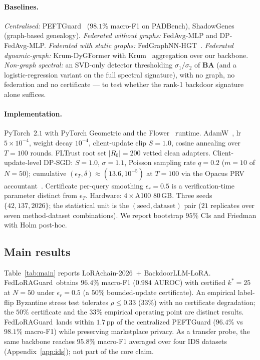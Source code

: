 \documentclass[11pt]{article}
\theoremstyle{plain}
\theoremstyle{definition}
\theoremstyle{remark}
\newcommand{\modelname}{FedLoRAGuard}
\newcommand{\benchname}{LoRAchain-2026}
\begin{document}
\paragraph{Baselines.}
\emph{Centralised:} PEFTGuard~\cite{sun2025peftguard} ($98.1\%$
macro-F1 on PADBench), ShadowGenes~\cite{schulz2025shadowgenes}
(graph-based genealogy).
\emph{Federated without graphs:} FedAvg-MLP and DP-FedAvg-MLP.
\emph{Federated with static graphs:}
FedGraphNN-HGT~\cite{he2021fedgraphnn}.
\emph{Federated dynamic-graph:} Krum-DyGFormer with
Krum~\cite{blanchard2017machine} aggregation over our backbone.
\emph{Non-graph spectral:} an SVD-only detector thresholding
$\sigma_1/\sigma_2$ of $\mathbf{B}\mathbf{A}$ (and a
logistic-regression variant on the full spectral signature), with
no graph, no federation and no certificate --- to test whether the
rank-1 backdoor signature alone suffices.

\paragraph{Implementation.}
PyTorch~$2.1$ with PyTorch Geometric and the
Flower~\cite{beutel2020flower} runtime. AdamW~\cite{loshchilov2019adamw},
lr $5\!\times\!10^{-4}$, weight decay $10^{-4}$, client-update
clip $S\!=\!1.0$, cosine annealing over $T\!=\!100$ rounds.
FLTrust root set $|R_0|\!=\!200$ vetted clean adapters.
Client-update-level DP-SGD: $S\!=\!1.0$, $\sigma\!=\!1.1$,
Poisson sampling rate $q\!=\!0.2$ ($m\!=\!10$ of $N\!=\!50$);
cumulative $(\epsilon_T,\delta)\!\approx\!(13.6,10^{-5})$ at
$T\!=\!100$ via the Opacus PRV
accountant~\cite{gopi2021numerical}. Certificate per-query
smoothing $\epsilon_r\!=\!0.5$ is a verification-time parameter
distinct from $\epsilon_T$. Hardware: $4\!\times\!$A100 80\,GB.
Three seeds $\{42,137,2026\}$; the statistical unit is the
$(\mathrm{seed},\mathrm{dataset})$ pair ($21$ replicates over
seven method-dataset combinations). We report bootstrap $95\%$
CIs and Friedman with Holm post-hoc.

\subsection{Main results}
\label{subsec:main}

Table~\ref{tab:main} reports \benchname\ + BackdoorLLM-LoRA.
\modelname\ obtains $96.4\%$ macro-F1 ($0.984$ AUROC) with
certified $k^*\!=\!25$ at $N\!=\!50$ under
$\epsilon_r\!=\!0.5$ (a $50\%$ bounded-update certificate). An
empirical label-flip Byzantine stress test tolerates
$\rho\!\le\!0.33$ ($33\%$) with no certificate degradation; the
$50\%$ certificate and the $33\%$ empirical operating point are
distinct results. \modelname\ lands within $1.7$\,pp of
the centralized PEFTGuard ($96.4\%$ vs $98.1\%$ macro-F1) while preserving
marketplace privacy. As a transfer probe, the same backbone
reaches $95.8\%$ macro-F1 averaged over four IDS datasets
(Appendix~\ref{app:ids}); not part of the core claim.
\end{document}
